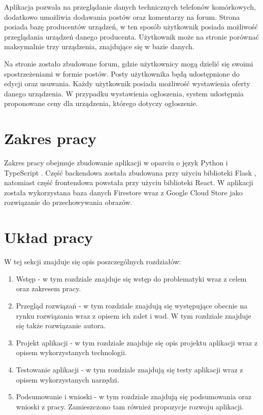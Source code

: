 Aplikacja pozwala na przeglądanie danych technicznych telefonów komórkowych, dodatkowo umożliwia dodawania postów oraz komentarzy na forum. Strona posiada bazę producentów urządzeń, w ten sposób użytkownik posiada możliwość przeglądania urządzeń danego producenta. Użytkownik może na stronie porównać maksymalnie trzy urządzenia, znajdujące się w bazie danych.

Na stronie zostało zbudowane forum, gdzie użytkownicy mogą dzielić się swoimi spostrzeżeniami w formie postów. Posty użytkownika będą udostępnione do edycji oraz usuwania. Każdy użytkownik posiada możliwość wystawienia oferty danego urządzenia. W przypadku wystawienia ogłoszenia, system udostępnia proponowane ceny dla urządzenia, którego dotyczy ogłoszenie.

\section{Zakres pracy}
Zakres pracy obejmuje zbudowanie aplikacji w oparciu o język Python \cite{python} i TypeScript \cite*{TypeScript}. Część backendowa została zbudowana przy użyciu biblioteki Flask \cite{flask}, natomiast część frontendowa powstała przy użyciu biblioteki React. W aplikacji została wykorzystana baza danych Firestore wraz z Google Cloud Store jako rozwiązanie do przechowywania obrazów. 

\section{Układ pracy}
W tej sekcji znajduje się opis poszczególnych rozdziałów:
\begin{enumerate}
  \item Wstęp - w tym rozdziale znajduje się wstęp do problematyki wraz z celem oraz zakresem pracy.
  \item Przegląd rozwiązań - w tym rozdziale znajdują się występujące obecnie na rynku rozwiązania wraz z opisem ich zalet i wad. W tym rozdziale znajduje się także rozwiązanie autora.
  \item Projekt aplikacji - w tym rozdziale znajduje się opis projektu aplikacji wraz z opisem wykorzystanych technologii.
  \item Testowanie aplikacji - w tym rozdziale znajdują się testy aplikacji wraz z opisem wykorzystanych narzędzi.
  \item Podsumowanie i wnioski - w tym rozdziale znajdują się podsumowania oraz wnioski z pracy. Zamieszczono tam również propozycje rozwoju aplikacji.
\end{enumerate}
